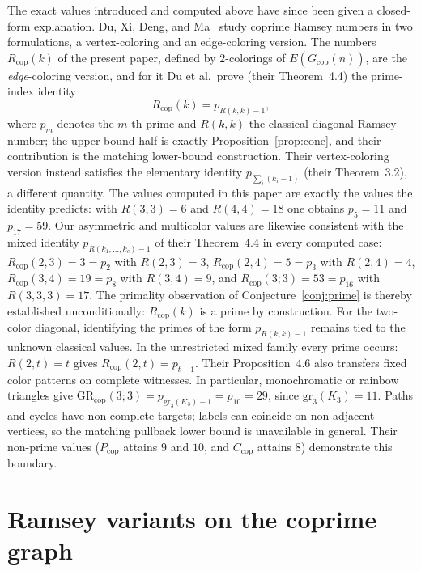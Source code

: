 \documentclass[12pt]{article}
\newcommand{\Rcop}{R_{\mathrm{cop}}}
\newcommand{\Pcop}{P_{\mathrm{cop}}}
\newcommand{\Ccop}{C_{\mathrm{cop}}}
\newcommand{\GRcop}{\mathrm{GR}_{\mathrm{cop}}}
\newcommand{\Gcop}{G_{\mathrm{cop}}}
\begin{document}
\begin{remark}\label{rem:duetal}
The exact values introduced and computed above have since been given a
closed-form explanation. Du, Xi, Deng, and Ma~\cite{du2026prime} study
coprime Ramsey numbers in two formulations, a vertex-coloring and an
edge-coloring version. The numbers $\Rcop(k)$ of the present paper,
defined by $2$-colorings of $E(\Gcop(n))$, are the \emph{edge}-coloring
version, and for it Du et al.\ prove (their Theorem~4.4) the prime-index
identity
\[
  \Rcop(k)=p_{R(k,k)-1},
\]
where $p_m$ denotes the $m$-th prime and $R(k,k)$ the classical diagonal
Ramsey number; the upper-bound half is exactly
Proposition~\ref{prop:cone}, and their contribution is the matching
lower-bound construction. Their vertex-coloring
version instead satisfies the elementary identity $p_{\sum_i(k_i-1)}$
(their Theorem~3.2), a different quantity. The values computed in this
paper are exactly the values the identity predicts: with $R(3,3)=6$
and $R(4,4)=18$ one obtains $p_{5}=11$ and $p_{17}=59$. Our
asymmetric and multicolor values are likewise consistent with the
mixed identity $p_{R(k_1,\ldots,k_c)-1}$ of their Theorem~4.4 in every
computed case: $\Rcop(2,3) = 3 = p_2$ with $R(2,3)=3$,
$\Rcop(2,4) = 5 = p_3$ with $R(2,4)=4$, $\Rcop(3,4) = 19 = p_8$ with
$R(3,4)=9$, and $\Rcop(3;3) = 53 = p_{16}$ with $R(3,3,3)=17$. The
primality observation of Conjecture~\ref{conj:prime} is thereby
established unconditionally: $\Rcop(k)$ is a prime by construction.
For the two-color diagonal, identifying the primes of the form
$p_{R(k,k)-1}$ remains tied to the unknown classical values. In the
unrestricted mixed family every prime occurs: $R(2,t)=t$ gives
$\Rcop(2,t)=p_{t-1}$. Their Proposition~4.6 also transfers fixed color patterns on
complete witnesses. In particular, monochromatic or rainbow triangles
give $\GRcop(3;3)=p_{\mathrm{gr}_3(K_3)-1}=p_{10}=29$, since
$\mathrm{gr}_3(K_3)=11$. Paths and cycles have non-complete targets;
labels can coincide on non-adjacent vertices, so the matching pullback
lower bound is unavailable in general. Their non-prime values
($\Pcop$ attains $9$ and $10$, and $\Ccop$ attains $8$) demonstrate
this boundary.
\end{remark}

\section{Ramsey variants on the coprime graph}\label{sec:variants}
\end{document}
